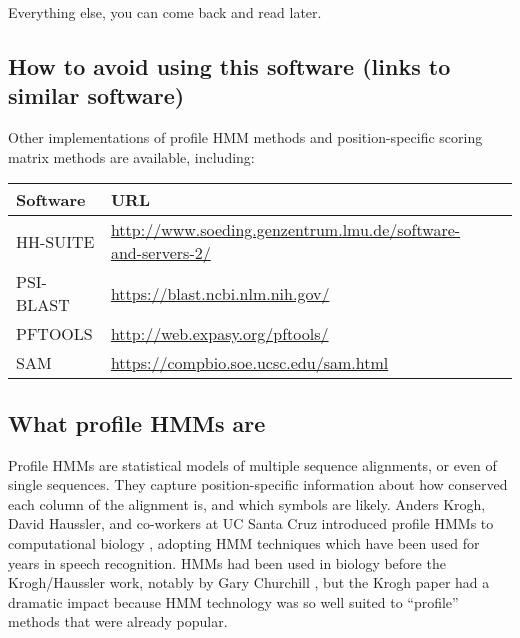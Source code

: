 Everything else, you can come back and read later.



\subsection{How to avoid using this software (links to similar software)}

Other implementations of profile HMM methods and position-specific
scoring matrix methods are available, including:

\begin{center}
\begin{tabular}{lp{5in}l}
Software  &   URL \\ \hline
HH-SUITE  & \url{http://www.soeding.genzentrum.lmu.de/software-and-servers-2/}\\
PSI-BLAST & \url{https://blast.ncbi.nlm.nih.gov/}\\
PFTOOLS   & \url{http://web.expasy.org/pftools/}\\
SAM       & \url{https://compbio.soe.ucsc.edu/sam.html}\\
\end{tabular}
\end{center}




\subsection{What profile HMMs are}

Profile HMMs are statistical models of multiple sequence alignments,
or even of single sequences. They capture position-specific
information about how conserved each column of the alignment is, and
which symbols are likely. Anders Krogh, David Haussler, and co-workers
at UC Santa Cruz introduced profile HMMs to computational biology
\citep{Krogh94}, adopting HMM techniques which have been used for
years in speech recognition.  HMMs had been used in biology before the
Krogh/Haussler work, notably by Gary Churchill \citep{Churchill89},
but the Krogh paper had a dramatic impact because HMM technology was
so well suited to ``profile'' methods that were already popular.

